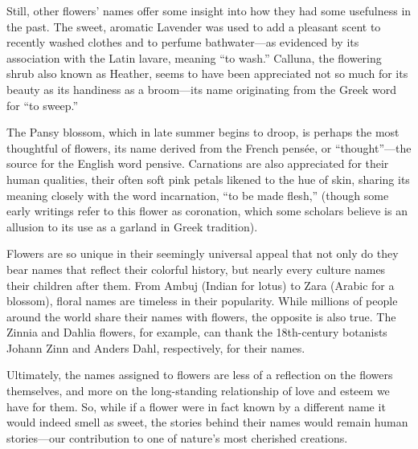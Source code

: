Still, other flowers' names offer some insight into how they had some
usefulness in the past. The sweet, aromatic Lavender was used to add a pleasant
scent to recently washed clothes and to perfume bathwater---as evidenced by its
association with the Latin lavare, meaning ``to wash.'' Calluna, the flowering
shrub also known as Heather, seems to have been appreciated not so much for its
beauty as its handiness as a broom---its name originating from the Greek word
for ``to sweep.''

The Pansy blossom, which in late summer begins to droop, is perhaps the most
thoughtful of flowers, its name derived from the French pensée, or
``thought''---the source for the English word pensive. Carnations are also
appreciated for their human qualities, their often soft pink petals likened to
the hue of skin, sharing its meaning closely with the word incarnation, ``to be
made flesh,'' (though some early writings refer to this flower as coronation,
which some scholars believe is an allusion to its use as a garland in Greek
tradition).

Flowers are so unique in their seemingly universal appeal that not only do they
bear names that reflect their colorful history, but nearly every culture names
their children after them. From Ambuj (Indian for lotus) to Zara (Arabic for
a blossom), floral names are timeless in their popularity. While millions of
people around the world share their names with flowers, the opposite is also
true. The Zinnia and Dahlia flowers, for example, can thank the 18th-century
botanists Johann Zinn and Anders Dahl, respectively, for their names.

Ultimately, the names assigned to flowers are less of a reflection on the
flowers themselves, and more on the long-standing relationship of love and
esteem we have for them. So, while if a flower were in fact known by
a different name it would indeed smell as sweet, the stories behind their names
would remain human stories---our contribution to one of nature's most cherished
creations.
